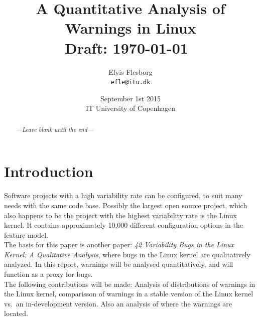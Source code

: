 \documentclass[a4paper,11pt]{report}
\begin{document}
\setlength{\parindent}{0cm}
\setlength{\unitlength}{1mm}

\date{September 1st 2015\\ IT University of Copenhagen}
\title{A Quantitative Analysis of Warnings in Linux \\ Draft: 
    \today~\currenttime}
\author{Elvis Flesborg\\
\texttt{efle@itu.dk}}
\clearpage\maketitle
\thispagestyle{empty}
\newpage

\tableofcontents
\thispagestyle{empty}



\newpage

\setcounter{page}{1}


\begin{abstract}
    \emph{---Leave blank until the end---}

\end{abstract}


\chapter{Introduction}
Software projects with a high variability rate can be configured, to suit many
needs with the same code base. Possibly the largest open source project, which 
also happens to be the project with the highest variability rate
is the Linux kernel. It contains approximately 10,000 different configuration 
options in the feature model.
\\

The basis for this paper is another  paper: \emph{42 Variability 
Bugs in the Linux Kernel: A Qualitative Analysis}\cite{42bugs}, where bugs in 
the Linux kernel are qualitatively analyzed. In this report, warnings will be 
analysed quantitatively, and will function as a proxy for bugs.
\\

The following contributions will be made: Analysis of distributions of warnings 
in the Linux kernel, comparisson of warnings in a stable version of the Linux 
kernel vs.\ an in-development version. Also an analysis of where the warnings 
are located.
\end{document}
